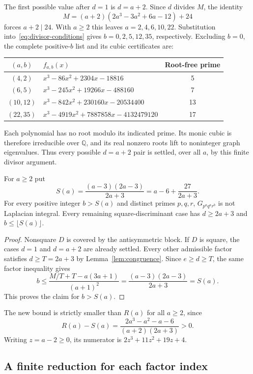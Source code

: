 The first possible value after $d=1$ is $d=a+2$.
Since $d$ divides $M$, the identity
\[
M=(a+2)(2a^3-3a^2+6a-12)+24
\]
forces $a+2\mid24$. With $a\geq2$ this leaves
$a=2,4,6,10,22$. Substitution into~\eqref{eq:divisor-conditions}
gives $b=0,2,5,12,35$, respectively. Excluding $b=0$, the complete
positive-$b$ list and its cubic certificates are:
\begin{center}
\begin{tabular}{clc}
\toprule
$(a,b)$ & $f_{a,b}(x)$ & Root-free prime\\
\midrule
$(4,2)$ & $x^3-86x^2+2304x-18816$ & 5\\
$(6,5)$ & $x^3-245x^2+19266x-488160$ & 7\\
$(10,12)$ & $x^3-842x^2+230160x-20534400$ & 13\\
$(22,35)$ & $x^3-4919x^2+7887858x-4132479120$ & 17\\
\bottomrule
\end{tabular}
\end{center}
Each polynomial has no root modulo its indicated prime. Its monic cubic
is therefore irreducible over $\mathbb Q$, and its real nonzero roots
lift to noninteger graph eigenvalues. Thus every possible $d=a+2$ pair
is settled, over all $a$, by this finite divisor argument.

\begin{theorem}
\label{thm:second}
For $a\geq2$ put
\[
S(a)=\frac{(a-3)(2a-3)}{2a+3}=a-6+\frac{27}{2a+3}.
\]
For every positive integer $b>S(a)$ and distinct primes $p,q,r$,
$G_{p^a q^a r^b}$ is not Laplacian integral.
Every remaining square-discriminant case has $d\geq2a+3$ and
$b\leq\lfloor S(a)\rfloor$.
\end{theorem}
\begin{proof}
Nonsquare $D$ is covered by the antisymmetric block. If $D$ is square,
the cases $d=1$ and $d=a+2$ are already settled. Every other admissible
factor satisfies $d\geq T=2a+3$ by Lemma~\ref{lem:congruence}.
Since $e\geq d\geq T$, the same factor inequality gives
\[
b\leq\frac{M/T+T-a(3a+1)}{(a+1)^2}
=\frac{(a-3)(2a-3)}{2a+3}=S(a).
\]
This proves the claim for $b>S(a)$.
\end{proof}

The new bound is strictly smaller than $R(a)$ for all $a\geq2$, since
\[
R(a)-S(a)=\frac{2a^3-a^2-a-6}{(a+2)(2a+3)}>0.
\]
Writing $z=a-2\geq0$, its numerator is $2z^3+11z^2+19z+4$.

\subsection{A finite reduction for each factor index}

